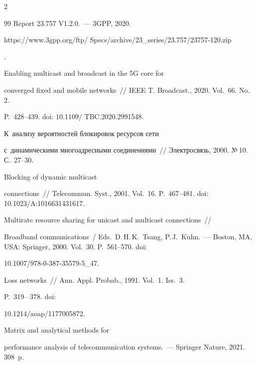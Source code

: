 \begin{multicols}{2}
{{\begin{thebibliography}{99}
Report 23.757 V1.2.0.~--- 3GPP, 2020. {\sf 

https://www.3gpp.org/ftp/ Specs/archive/23\_series/23.757/23757-120.zip}.




 Enabling multicast and broadcast in the 5G core for 

converged fixed and mobile networks~// IEEE T. Broadcast., 2020. Vol.~66. No.\,2.  

P.~428--439. doi: 10.1109/ TBC.2020.2991548.


 К~анализу вероятностей блокировок ресурсов сети 

с~динамическими многоадресными со\-еди\-не\-ни\-ями~// Электросвязь, 2000. №\,10. С.~27--30.


 Blocking of dynamic multicast 

connections~// Telecommun. Syst., 2001. Vol.~16. P.~467--481. doi: 10.1023/A:1016631431617.


 Multirate resource sharing for unicast and multicast connections~// 

Broadband communications~/ Eds.\ D.\,H.\,K.~Tsang, P.\,J.~K$\ddot{\mbox{u}}$hn.~--- Boston, MA, USA: Springer, 2000. Vol.~30. P.~561--570. doi: 

10.1007/978-0-387-35579-5\_47.



\pagebreak




 Loss networks~// Ann. Appl. Probab., 1991. Vol.~1. Iss.~3.  

P.~319-- 378.  doi: 

10.1214/aoap/1177005872.


 Matrix and analytical methods for 

performance analysis of telecommunication systems.~--- Springer Nature, 2021. 308~p.


\end{thebibliography}}}
\end{multicols}
